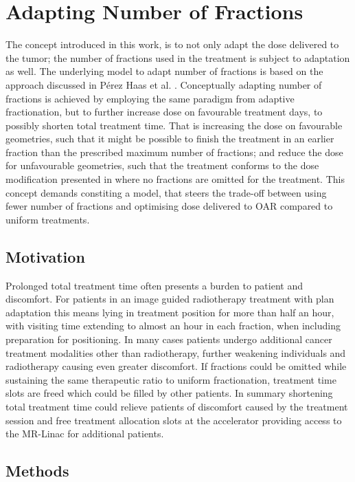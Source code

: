 \documentclass[\relativeRoot/ada.tex]{subfiles}
\begin{document}
\section{Adapting Number of Fractions}
The concept introduced in this work, is to not only adapt the dose delivered to the tumor; the number of fractions used in the treatment is subject to adaptation as well. The underlying model to adapt number of fractions is based on the approach discussed in Pérez Haas et al. \cite{perezhaas_adaptive}. Conceptually adapting number of fractions is achieved by employing the same paradigm from adaptive fractionation, but to further increase dose on favourable treatment days, to possibly shorten total treatment time. That is increasing the dose on favourable geometries, such that it might be possible to finish the treatment in an earlier fraction than the prescribed maximum number of fractions; and reduce the dose for unfavourable geometries, such that the treatment conforms to the dose modification presented in \cite{perezhaas_adaptive} where no fractions are omitted for the treatment. This concept demands constiting a model, that steers the trade-off between using fewer number of fractions and optimising dose delivered to OAR compared to uniform treatments.

\subsection{Motivation}
Prolonged total treatment time often presents a burden to patient and discomfort. For patients in an image guided radiotherapy treatment with plan adaptation this means lying in treatment position for more than half an hour, with visiting time extending to almost an hour in each fraction, when including preparation for positioning. In many cases patients undergo additional cancer treatment modalities other than radiotherapy, further weakening individuals and radiotherapy causing even greater discomfort. If fractions could be omitted while sustaining the same therapeutic ratio to uniform fractionation, treatment time slots are freed which could be filled by other patients. In summary shortening total treatment time could relieve patients of discomfort caused by the treatment session and free treatment allocation slots at the accelerator providing access to the MR-Linac for additional patients.

\subsection{Methods}
\end{document}
